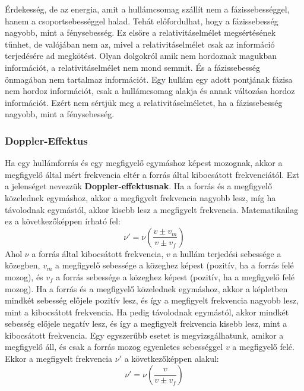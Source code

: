 \documentclass[../main.tex]{subfiles}
\begin{document}
Érdekesség, de az energia, amit a hullámcsomag szállít nem a fázissebességgel, hanem a csoportsebességgel halad. Tehát előfordulhat, hogy a fázissebesség nagyobb, mint a fénysebesség.
Ez elsőre a relativitáselmélet megsértésének tűnhet, de valójában nem az, mivel a relativitáselmélet csak az információ terjedésére ad megkötést. Olyan dolgokról amik nem hordoznak magukban információt, a relativitáselmélet nem mond semmit.
És a fázissebesség önmagában nem tartalmaz információt. Egy hullám egy adott pontjának fázisa nem hordoz információt, csak a hullámcsomag alakja és annak változása hordoz információt.
Ezért nem sértjük meg a relativitáselméletet, ha a fázissebesség nagyobb, mint a fénysebesség.

\subsubsection{Doppler-Effektus}
Ha egy hullámforrás és egy megfigyelő egymáshoz képest mozognak, akkor a megfigyelő által mért frekvencia eltér a forrás által kibocsátott frekvenciától. Ezt a jelenséget nevezzük \textbf{Doppler-effektusnak}.
Ha a forrás és a megfigyelő közelednek egymáshoz, akkor a megfigyelt frekvencia nagyobb lesz, míg ha távolodnak egymástól, akkor kisebb lesz a megfigyelt frekvencia.
Matematikailag ez a következőképpen írható fel: 
\begin{equation}
    \nu' = \nu \left( \frac{v \pm v_{m}}{v \pm v_f} \right)
\end{equation}
Ahol $\nu$ a forrás által kibocsátott frekvencia, $v$ a hullám terjedési sebessége a közegben, $v_m$ a megfigyelő sebessége a közeghez képest (pozitív, ha a forrás felé mozog), és $v_f$ a forrás sebessége a közeghez képest (pozitív, ha a megfigyelő felé mozog).
Ha a forrás és a megfigyelő közelednek egymáshoz, akkor a képletben mindkét sebesség előjele pozitív lesz, és így a megfigyelt frekvencia nagyobb lesz, mint a kibocsátott frekvencia.
Ha pedig távolodnak egymástól, akkor mindkét sebesség előjele negatív lesz, és így a megfigyelt frekvencia kisebb lesz, mint a kibocsátott frekvencia.
Egy egyszerűbb esetet is megvizsgálhatunk, amikor a megfigyelő áll, és csak a forrás mozog egyenletes sebességgel $v$ a megfigyelő felé. Ekkor a megfigyelt frekvencia $\nu'$ a következőképpen alakul:
\begin{equation}
    \nu' = \nu \left( \frac{v}{v \pm v_f} \right)
\end{equation} 
\end{document}

